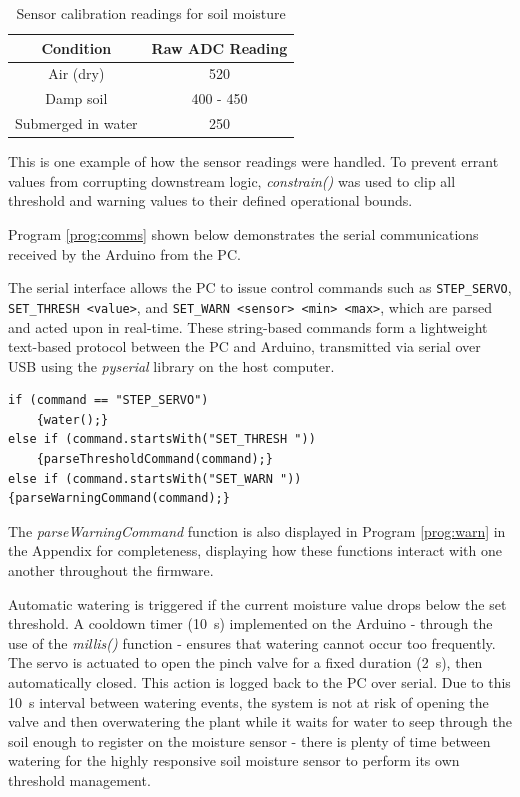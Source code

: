 \documentclass[a4paper,11pt]{article}
\begin{document}
\begin{table}[H]
    \centering
    \begin{tabular}{|c|c|}
        \hline
        \textbf{Condition} & \textbf{Raw ADC Reading} \\
        \hline
        Air (dry) & 520 \\
        \hline
        Damp soil & 400 - 450 \\
        \hline
        Submerged in water & 250 \\
        \hline
    \end{tabular}
    \caption{Sensor calibration readings for soil moisture}
    \label{tab:sensor_calibration}
\end{table}

This is one example of how the sensor readings were handled.
To prevent errant values from corrupting downstream logic, 
\textit{constrain()} was used to clip all threshold and 
warning values to their defined operational bounds.

Program \ref{prog:comms} shown below demonstrates the serial communications
received by the Arduino from the PC.

The serial interface allows the PC to issue control commands such as 
\texttt{STEP\_SERVO}, \texttt{SET\_THRESH <value>}, and 
\texttt{SET\_WARN <sensor> <min> <max>}, which are parsed and acted upon 
in real-time.
These string-based commands form a lightweight text-based protocol between 
the PC and Arduino, transmitted via 
serial over USB using the \textit{pyserial} library 
on the host computer. 

\begin{lstlisting}[style=cpp-style, 
caption={Communication with the PC}, label={prog:comms}]
if (command == "STEP_SERVO")
    {water();}
else if (command.startsWith("SET_THRESH "))
    {parseThresholdCommand(command);}
else if (command.startsWith("SET_WARN "))
{parseWarningCommand(command);}
\end{lstlisting}

The \textit{parseWarningCommand} function is also displayed in 
Program \ref{prog:warn} in the Appendix for completeness,
displaying how these functions interact with one another 
throughout the firmware.

Automatic watering is triggered if the current moisture value drops below 
the set threshold. A cooldown timer (\SI{10}{\second}) implemented on the Arduino - 
through the use of the \textit{millis()} function -
ensures that watering cannot occur too frequently. 
The servo is actuated to open the 
pinch valve for a fixed duration (\SI{2}{\second}), then automatically closed. 
This action is logged back to the PC over serial.
Due to this \SI{10}{\second} interval between watering events,
the system is not at risk of opening the valve 
and then overwatering the plant while it waits for water
to seep through the soil enough to register on the moisture sensor - 
there is plenty of time between watering for the highly responsive
soil moisture sensor to perform its own threshold management.
\end{document}
